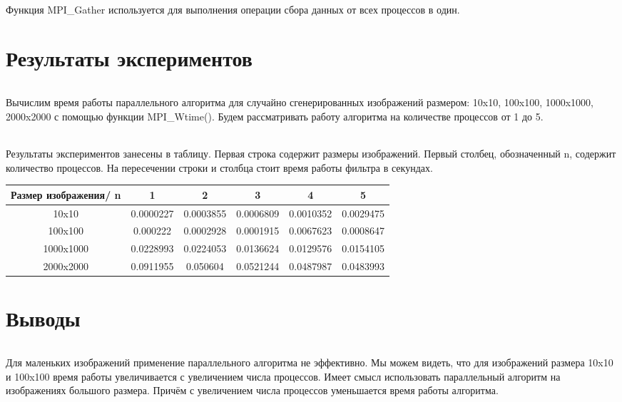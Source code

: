 \documentclass[12pt,a4paper]{article}
\begin{document}
\begin{enumerate}
\paragraph{} Функция MPI\_Gather используется для выполнения операции сбора данных от всех процессов в один.\\
\end{enumerate} 
\part*{Результаты экспериментов}
\paragraph{}Вычислим время работы параллельного алгоритма для случайно сгенерированных изображений размером: 10x10, 100x100, 1000x1000, 2000x2000 с помощью функции MPI\_Wtime(). Будем рассматривать работу алгоритма на количестве процессов от 1 до 5.
\paragraph{}Результаты экспериментов занесены в таблицу. Первая строка содержит размеры изображений. Первый столбец, обозначенный n, содержит количество процессов. На пересечении строки и столбца стоит время работы фильтра в секундах.
\begin{center}
\begin{tabular}{|c | c | c | c | c | c |} 
 \hline 
 Размер изображения/ n & 1 & 2 & 3 & 4 & 5 \\ [0.5ex] 
 \hline
  10x10 & 0.0000227 & 0.0003855 & 0.0006809 & 0.0010352 & 0.0029475 \\
 \hline
  100x100 & 0.000222 & 0.0002928 & 0.0001915 & 0.0067623 & 0.0008647 \\
 \hline
  1000x1000 & 0.0228993 & 0.0224053 & 0.0136624 & 0.0129576 & 0.0154105 \\
 \hline
 2000x2000 & 0.0911955 & 0.050604 & 0.0521244 & 0.0487987 & 0.0483993 \\
[1ex] 
 \hline
\end{tabular}
\end{center}


\part*{Выводы }
\paragraph{} Для маленьких изображений применение параллельного алгоритма не эффективно. Мы можем видеть, что для изображений размера 10x10 и 100x100 время работы увеличивается с увеличением числа процессов. Имеет смысл использовать параллельный алгоритм на изображениях большого размера. Причём с увеличением числа процессов уменьшается время работы алгоритма.  
\end{document}
